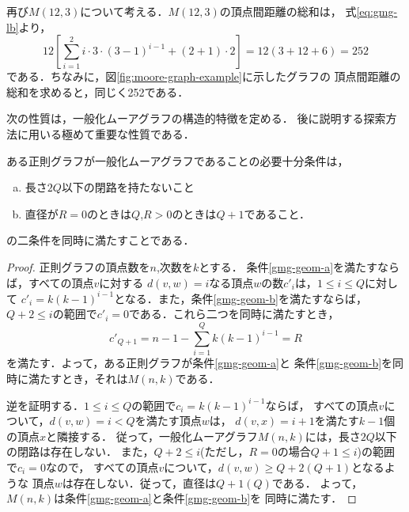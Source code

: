 \begin{example}
  再び$M(12,3)$について考える．$M(12,3)$の頂点間距離の総和は，
  式\ref{eq:gmg-lb}より，
  \[ 12\left[\sum_{i=1}^2i\cdot3\cdot(3-1)^{i-1}+(2+1)\cdot2\right]=
  12(3+12+6)=252\]
  である．ちなみに，図\ref{fig:moore-graph-example}に示したグラフの
  頂点間距離の総和を求めると，同じく252である．
\end{example}

次の性質は，一般化ムーアグラフの構造的特徴を定める．
後に説明する探索方法に用いる極めて重要な性質である．
\begin{theorem}
  \label{theorem:gmg-geometric-property}
  ある正則グラフが一般化ムーアグラフであることの必要十分条件は，
  \begin{enumerate}[a)]
  \item 長さ$2Q$以下の閉路を持たないこと
    \label{gmg-geom-a}
  \item 直径が$R=0$のときは$Q$,\hspace{1ex}$R>0$のときは$Q+1$であること．
    \label{gmg-geom-b}
  \end{enumerate}
  の二条件を同時に満たすことである．
\end{theorem}
\begin{proof}
  正則グラフの頂点数を$n$,次数を$k$とする．
  条件\ref{gmg-geom-a}を満たすならば，すべての頂点$v$に対する
  $d(v,w)=i$なる頂点$w$の数$c'_i$は，$1\leq i\leq Q$に対して
  $c'_i=k(k-1)^{i-1}$となる．また，条件\ref{gmg-geom-b}を満たすならば，
  $Q+2\leq i$の範囲で$c'_i=0$である．これら二つを同時に満たすとき，
  \[ c'_{Q+1}=n-1-\sum_{i=1}^{Q}k(k-1)^{i-1}=R \]
  を満たす．よって，ある正則グラフが条件\ref{gmg-geom-a}と
  条件\ref{gmg-geom-b}を同時に満たすとき，それは$M(n,k)$である．

  逆を証明する．$1\leq i\leq Q$の範囲で$c_i=k(k-1)^{i-1}$ならば，
  すべての頂点$v$について，$d(v,w)=i<Q$を満たす頂点$w$は，
  $d(v,x)=i+1$を満たす$k-1$個の頂点$x$と隣接する．
  従って，一般化ムーアグラフ$M(n,k)$には，長さ$2Q$以下の閉路は存在しない．
  また，$Q+2\leq i$(ただし，$R=0$の場合$Q+1\leq i$)の範囲で$c_i=0$なので，
  すべての頂点$v$について，$d(v,w)\geq Q+2$\hspace{.3ex}$(Q+1)$となるような
  頂点$w$は存在しない．従って，直径は$Q+1$\hspace{.3ex}$(Q)$である．
  よって，$M(n,k)$は条件\ref{gmg-geom-a}と条件\ref{gmg-geom-b}を
  同時に満たす．
\end{proof}
